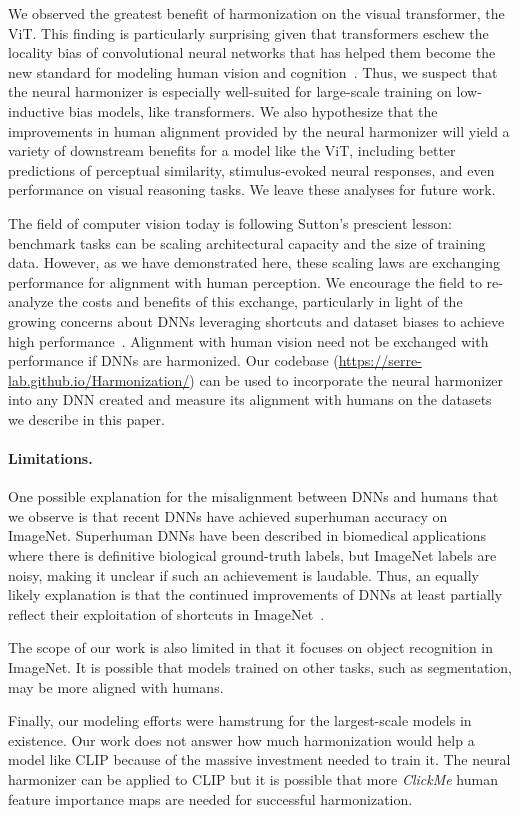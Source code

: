 We observed the greatest benefit of harmonization on the visual transformer, the ViT. This finding is particularly surprising given that transformers eschew the locality bias of convolutional neural networks that has helped them become the new standard for modeling human vision and cognition~\cite{Serre2019-bb}. Thus, we suspect that the neural harmonizer is especially well-suited for large-scale training on low-inductive bias models, like transformers. We also hypothesize that the improvements in human alignment provided by the neural harmonizer will yield a variety of downstream benefits for a model like the ViT, including better predictions of perceptual similarity, stimulus-evoked neural responses, and even performance on visual reasoning tasks. We leave these analyses for future work.

The field of computer vision today is following Sutton's prescient lesson: benchmark tasks can be scaling architectural capacity and the size of training data. However, as we have demonstrated here, these scaling laws are exchanging performance for alignment with human perception. We encourage the field to re-analyze the costs and benefits of this exchange, particularly in light of the growing concerns about DNNs leveraging shortcuts and dataset biases to achieve high performance~\cite{Geirhos2020-nl}. Alignment with human vision need not be exchanged with performance if DNNs are harmonized. Our codebase (\url{https://serre-lab.github.io/Harmonization/}) can be used to incorporate the neural harmonizer into any DNN created and measure its alignment with humans on the datasets we describe in this paper.

\paragraph{Limitations.} One possible explanation for the misalignment between DNNs and humans that we observe is that recent DNNs have achieved superhuman accuracy on ImageNet. Superhuman DNNs have been described in biomedical applications~\cite{Linsley2021-tb,Lee2017-ip} where there is definitive biological ground-truth labels, but ImageNet labels are noisy, making it unclear if such an achievement is laudable. Thus, an equally likely explanation is that the continued improvements of DNNs at least partially reflect their exploitation of shortcuts in ImageNet~\cite{Geirhos2020-nl}. 

The scope of our work is also limited in that it focuses on object recognition in ImageNet. It is possible that models trained on other tasks, such as segmentation, may be more aligned with humans.

Finally, our modeling efforts were hamstrung for the largest-scale models in existence. Our work does not answer how much harmonization would help a model like CLIP because of the massive investment needed to train it. The neural harmonizer can be applied to CLIP but it is possible that more \textit{ClickMe} human feature importance maps are needed for successful harmonization.




